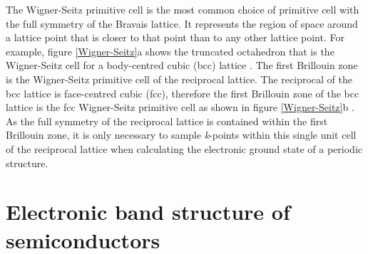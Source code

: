 \documentclass[11pt, twoside]{report}
\begin{document}
The Wigner-Seitz primitive cell is the most common choice of primitive cell with the full symmetry of the Bravais lattice. It represents the region of space around a lattice point  that is closer to that point than to any other lattice point. For example, figure \ref{Wigner-Seitz}a shows the truncated octahedron that is the Wigner-Seitz cell for a body-centred cubic (bcc) lattice \cite{AshcroftMermin2}.
The first Brillouin zone is the Wigner-Seitz primitive cell of the reciprocal lattice. The reciprocal of the bcc lattice is face-centred cubic (fcc), therefore the first Brillouin zone of the bcc lattice is the fcc Wigner-Seitz primitive cell as shown in figure \ref{Wigner-Seitz}b \cite{AshcroftMermin3}. As the full symmetry of the reciprocal lattice is contained within the first Brillouin zone, it is only necessary to sample \textit{k}-points within this single unit cell of the reciprocal lattice when calculating the electronic ground state of a periodic structure.



\section{Electronic band structure of semiconductors}\label{BandTheorySection}

\end{document}

